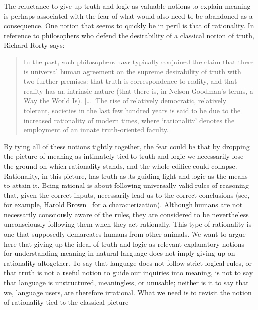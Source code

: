 \documentclass[a4paper]{article}
\begin{document}
The reluctance to give up truth and logic as valuable notions to explain meaning is perhaps associated with the fear of what would also need to be abandoned as a consequence.
One notion that seems to quickly be in peril is that of rationality.
In reference to philosophers who defend the desirability of a classical notion of truth, Richard Rorty says:
\begin{quote}
In the past, such philosophers have typically conjoined the claim that there is universal human agreement on the supreme desirability of truth with two further premises: that truth is correspondence to reality, and that reality has an intrinsic nature (that there is, in Nelson Goodman's terms, a Way the World Is).
[\ldots]
The rise of relatively democratic, relatively tolerant, societies in the last few hundred years is said to be due to the increased rationality of modern times, where `rationality' denotes the employment of an innate truth-oriented faculty.%
~\parencite*[1]{rorty_response_2000-1}
\end{quote}
By tying all of these notions tightly together, the fear could be that by dropping the picture of meaning as intimately tied to truth and logic we necessarily lose the ground on which rationality stands, and the whole edifice could collapse.
Rationality, in this picture, has truth as its guiding light and logic as the means to attain it.
Being rational is about following universally valid rules of reasoning that, given the correct inputs, necessarily lead us to the correct conclusions (see, for example, Harold Brown~\parencite*[19]{brown_rationality_1990} for a characterization).
Although humans are not necessarily consciously aware of the rules, they are considered to be nevertheless unconsciously following them when they act rationally.
This type of rationality is one that supposedly demarcates humans from other animals.
We want to argue here that giving up the ideal of truth and logic as relevant explanatory notions for understanding meaning in natural language does not imply giving up on rationality altogether.
To say that language does not follow strict logical rules, or that truth is not a useful notion to guide our inquiries into meaning, is not to say that language is unstructured, meaningless, or unusable; neither is it to say that we, language users, are therefore irrational.
What we need is to revisit the notion of rationality tied to the classical picture.
\end{document}
